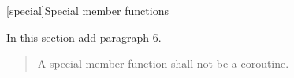 
\setcounter{chapter}{11}
[special]{Special member functions}

In this section add paragraph 6.

\begin{quote}
	\setcounter{Paras}{5}
	\pnum
	A special member function shall not be a coroutine.
\end{quote}
